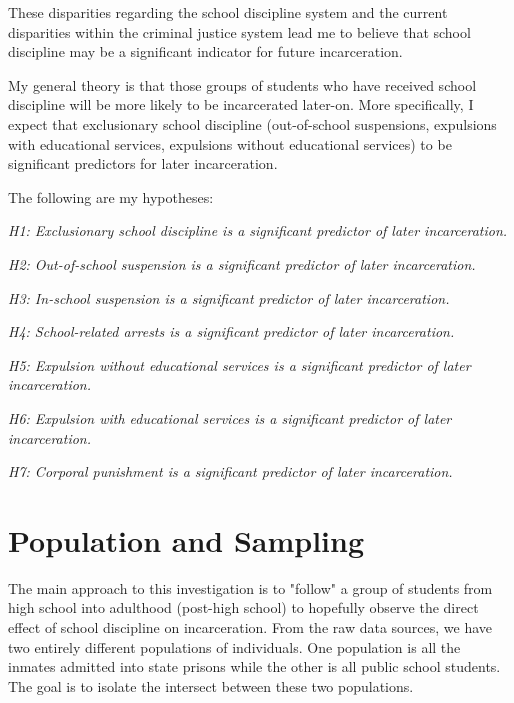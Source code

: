 \documentclass[12pt]{article}
\begin{document}
These disparities regarding the school discipline system and the current disparities within the criminal justice system lead me to believe that school discipline may be a significant indicator for future incarceration. 

My general theory is that those groups of students who have received school discipline will be more likely to be incarcerated later-on. More specifically, I expect that exclusionary school discipline (out-of-school suspensions, expulsions with educational services, expulsions without educational services) to be significant predictors for later incarceration. 

The following are my hypotheses:

\begin{center}
  \emph{H1: Exclusionary school discipline is a 
  \newline significant predictor of later incarceration.}

  \emph{H2: Out-of-school suspension is a 
  \newline significant predictor of later incarceration.}

  \emph{H3: In-school suspension is a 
  \newline significant predictor of later incarceration.}

  \emph{H4: School-related arrests is a 
  \newline significant predictor of later incarceration.}

  \emph{H5: Expulsion without educational services 
  \newline is a significant predictor of later incarceration.}

  \emph{H6: Expulsion with educational services 
  \newline is a significant predictor of later incarceration.}

  \emph{H7: Corporal punishment is a 
  \newline significant predictor of later incarceration.}
\end{center}



\section*{Population and Sampling}
The main approach to this investigation is to "follow" a group of students from high school into adulthood (post-high school) to hopefully observe the direct effect of school discipline on incarceration. From the raw data sources, we have two entirely different populations of individuals. One population is all the inmates admitted into state prisons while the other is all public school students. The goal is to isolate the intersect between these two populations. 
\end{document}
